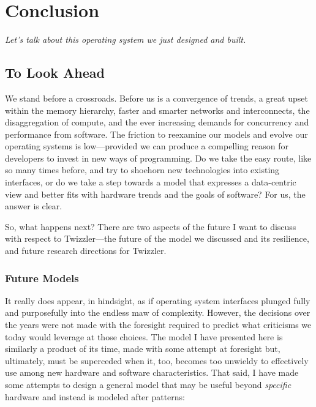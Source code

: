 
\chapter{Conclusion}\label{ch:conclusion}


\emph{Let's talk about this operating system we just designed and built.}

\section{To Look Ahead}



We stand before a crossroads. Before us is a convergence of trends, a great upset within the memory hierarchy, faster
and smarter networks and interconnects, the disaggregation of compute, and the
ever increasing demands for concurrency and performance from software. The friction to reexamine our models and evolve
our operating systems is low---provided we can produce a compelling reason for developers to invest in new ways of programming.
Do we take the easy route, like so many times before, and try to shoehorn new technologies into existing interfaces, or
do we take a step towards a model that expresses a data-centric view and better fits with hardware trends and the goals
of software? For us, the answer is clear.

So, what happens next? There are two aspects of the future I want to discuss with respect to Twizzler---the future of
the model we discussed and its resilience, and future research directions for Twizzler.

\subsection{Future Models}

It really does appear, in hindsight, as if operating system interfaces plunged fully and purposefully into the endless maw of
complexity. However, the decisions over the years were not made with the foresight required to predict what criticisms
we today would leverage at those choices. The model I have presented here is similarly a product of its time, made with
some attempt at foresight but, ultimately, must be superceded when it, too, becomes too unwieldy to effectively use
among new hardware and software characteristics. That said, I have made some attempts to design a general model that
may be useful beyond \emph{specific} hardware and instead is modeled after patterns:

